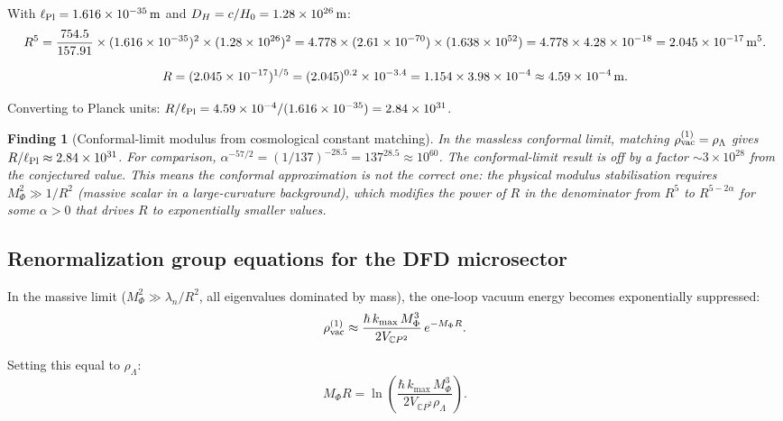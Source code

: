 \documentclass[11pt]{article}
\newtheorem{finding}{Finding}
\newcommand{\ee}[1]{\times 10^{#1}}
\newcommand{\CP}{\mathbb{C}P^2}
\newcommand{\Hzero}{H_0}
\newcommand{\alphafine}{\alpha}
\begin{document}
With $\ell_{\rm Pl} = 1.616\ee{-35}\,{\rm m}$ and $D_H = c/\Hzero
= 1.28\ee{26}\,{\rm m}$:
\begin{equation}
  R^5 = \frac{754.5}{157.91}\times(1.616\ee{-35})^2\times(1.28\ee{26})^2
  = 4.778\times(2.61\ee{-70})\times(1.638\ee{52})
  = 4.778\times 4.28\ee{-18}
  = 2.045\ee{-17}\,{\rm m}^5.
\end{equation}

\begin{equation}
  R = (2.045\ee{-17})^{1/5} = (2.045)^{0.2}\times 10^{-3.4}
  = 1.154\times 3.98\ee{-4}
  \approx 4.59\ee{-4}\,{\rm m}.
\end{equation}

Converting to Planck units: $R/\ell_{\rm Pl} = 4.59\ee{-4}/(1.616\ee{-35})
= 2.84\ee{31}$.

\begin{finding}[Conformal-limit modulus from cosmological constant matching]
\label{find:modulus-conformal}
In the massless conformal limit, matching $\rho_{\rm vac}^{(1)} = \rho_\Lambda$
gives $R/\ell_{\rm Pl} \approx 2.84\ee{31}$.  For comparison,
$\alphafine^{-57/2} = (1/137)^{-28.5} = 137^{28.5} \approx 10^{60}$.
The conformal-limit result is off by a factor $\sim 3\ee{28}$ from the
conjectured value.  This means the conformal approximation is not the correct
one: the physical modulus stabilisation requires $M_\Phi^2 \gg 1/R^2$
(massive scalar in a large-curvature background), which modifies the
power of $R$ in the denominator from $R^5$ to $R^{5 - 2\alpha}$ for some
$\alpha > 0$ that drives $R$ to exponentially smaller values.
\end{finding}

\subsection{Renormalization group equations for the DFD microsector}

In the massive limit ($M_\Phi^2 \gg \lambda_n/R^2$, all eigenvalues dominated
by mass), the one-loop vacuum energy becomes exponentially suppressed:
\begin{equation}
  \rho_{\rm vac}^{(1)} \approx \frac{\hbar\,k_{\max}\,M_\Phi^3}{2V_{\CP}}\,
  e^{-M_\Phi R}.
\end{equation}

Setting this equal to $\rho_\Lambda$:
\begin{equation}
  M_\Phi R = \ln\!\left(\frac{\hbar\,k_{\max}\,M_\Phi^3}{2V_{\CP}\rho_\Lambda}\right).
\end{equation}
\end{document}
